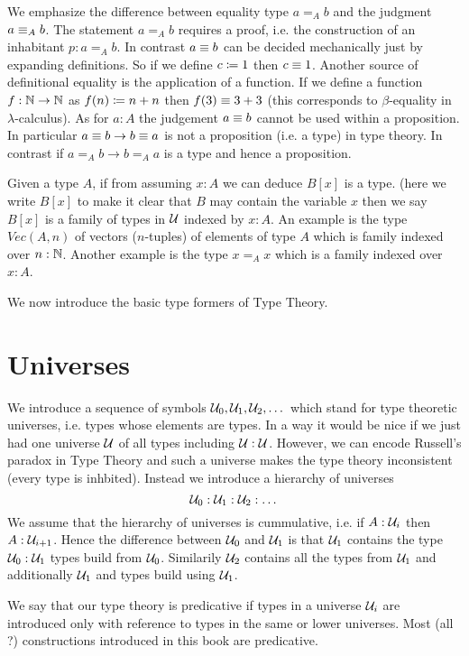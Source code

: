 {We emphasize the difference between equality type $a =_A
b$ and the judgment $a \equiv_A b$. The statement $a =_A b$ requires a
proof, i.e. the construction of an inhabitant $p : a =_A b$. In
contrast $a \equiv b$ can be decided mechanically just by expanding
definitions. So if we define $c \coloneqq 1$ then $c\equiv 1$. Another
source of definitional equality is the application of a function. If
we define a function $f : \mathbb{N} \to \mathbb{N}$ as $f(n) \coloneqq n + n$ then
$f(3) \equiv 3+3$ (this corresponds to $\beta$-equality in
$\lambda$-calculus). As for $a : A$ the judgement $a \equiv b$
cannot be used within a proposition. In particular  $a
\equiv b \to b \equiv a$ is not a proposition (i.e. a type) in type theory. In
contrast if $a =_A b \to b =_A a$ is a type and hence a proposition.

Given a type $A$, if from assuming $x:A$ we can deduce $B[x]$ is a type.
(here we write $B[x]$ to make it clear that $B$ may contain the
variable $x$ then we say $B[x]$ is a
family of types in ${\mathcal U}$ indexed by $x:A$. An example is the type $Vec(A,n)$ of
vectors ($n$-tuples) of elements of type $A$ which is family indexed
over $n : \mathbb{N}$. Another example is the type $x =_A x$ which is a
family indexed over $x : A$.

We now introduce the basic type formers of Type Theory.

\section{Universes}
\label{sec:universes}

We introduce a sequence of symbols ${\mathcal U}_0,{\mathcal U}_1,{\mathcal U}_2, \dots$ which
stand for type theoretic universes, i.e. types whose elements are
types. In a way it would be nice if we just had one universe ${\mathcal U}$ of
all types including ${\mathcal U} : {\mathcal U}$. However, we can encode Russell's
paradox in Type Theory and such a universe makes the type theory
inconsistent (every type is inhbited). Instead we introduce a
hierarchy of universes
\[ {\mathcal U}_0 : {\mathcal U}_1 : {\mathcal U}_2 : \dots \]
We assume that the hierarchy of universes is cummulative, i.e. if
$A:{\mathcal U}_i$ then $A : {\mathcal U}_{i+1}$. Hence the difference between
${\mathcal U}_0$ and ${\mathcal U}_1$ is that ${\mathcal U}_1$ contains the type ${\mathcal U}_0:{\mathcal U}_1$
types build from ${\mathcal U}_0$. Similarily ${\mathcal U}_2$ contains all the types
from ${\mathcal U}_1$ and additionally ${\mathcal U}_1$ and types build using ${\mathcal U}_1$. 

We say that our type theory is predicative if types in a universe
${\mathcal U}_i$ are introduced only with reference to types in the same or
lower universes. Most (all ?) constructions introduced in this book
are predicative. 

}
